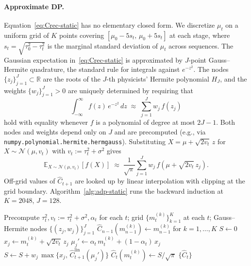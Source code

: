 \documentclass[11pt]{article}
\begin{document}
\paragraph{Approximate DP.}
\label{sec:adp-static}
Equation~\eqref{eq:Crec-static} has no elementary closed form. We discretize $\mu_t$ on a uniform grid of $K$ points covering $[\mu_0 - 5 s_t,\, \mu_0 + 5 s_t]$ at each stage, where $s_t = \sqrt{\tau_0^2 - \tau_t^2}$ is the marginal standard deviation of $\mu_t$ across sequences. The Gaussian expectation in~\eqref{eq:Crec-static} is approximated by $J$-point Gauss--Hermite quadrature, the standard rule for integrals against $e^{-z^2}$. The nodes $\{z_j\}_{j=1}^J \subset \mathbb{R}$ are the roots of the $J$-th physicists' Hermite polynomial $H_J$, and the weights $\{w_j\}_{j=1}^J > 0$ are uniquely determined by requiring that
\[
\int_{-\infty}^\infty f(z)\, e^{-z^2}\, dz \;\approx\; \sum_{j=1}^J w_j\, f(z_j)
\]
hold with equality whenever $f$ is a polynomial of degree at most $2J - 1$. Both nodes and weights depend only on $J$ and are precomputed (e.g., via \texttt{numpy.polynomial.hermite.hermgauss}). Substituting $X = \mu + \sqrt{2 v_t}\,z$ for $X \sim \mathcal{N}(\mu, v_t)$ with $v_t := \tau_t^2 + \sigma^2$ gives
\begin{equation}
\label{eq:gh}
\mathbb{E}_{X \sim \mathcal{N}(\mu, v_t)}[f(X)] \;\approx\; \frac{1}{\sqrt\pi}\sum_{j=1}^J w_j\, f\!\left(\mu + \sqrt{2 v_t}\, z_j\right).
\end{equation}
Off-grid values of $\widehat C_{t+1}$ are looked up by linear interpolation with clipping at the grid boundary. Algorithm~\ref{alg:adp-static} runs the backward induction at $K = 2048$, $J = 128$.

\begin{algorithm}[H]
\caption{Approximate DP for the static-variance Bayes-optimal threshold (per regime).}
\label{alg:adp-static}
\begin{algorithmic}[1]
\State Precompute $\tau_t^2, v_t := \tau_t^2 + \sigma^2, \alpha_t$ for each $t$; grid $\{m_t^{(k)}\}_{k=1}^K$ at each $t$; Gauss--Hermite nodes $\{(z_j, w_j)\}_{j=1}^J$
\State $\widehat C_{n-1}(m_{n-1}^{(k)}) \gets m_{n-1}^{(k)}$ for $k = 1, \ldots, K$
    \State $S \gets 0$
      \State $x_j \gets m_t^{(k)} + \sqrt{2 v_t}\, z_j$
      \State $\mu_j' \gets \alpha_t\, m_t^{(k)} + (1-\alpha_t)\, x_j$
      \State $S \gets S + w_j\, \max\!\big\{x_j,\, \widehat C_{t+1}^{\mathrm{lin}}(\mu_j')\big\}$
    \EndFor
    \State $\widehat C_t(m_t^{(k)}) \gets S/\sqrt\pi$
  \EndFor
\EndFor
\State \Return $\{\widehat C_t\}$
\end{algorithmic}
\end{algorithm}
\end{document}
